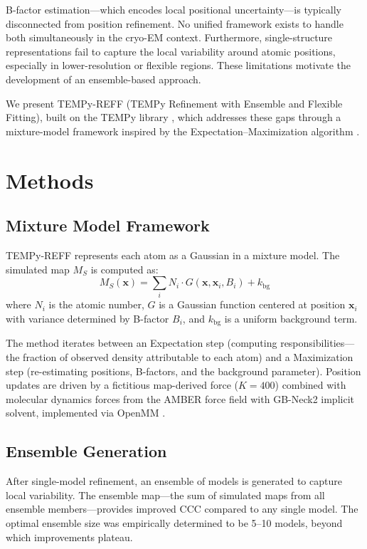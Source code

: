 \documentclass[11pt]{article}
\begin{document}
B-factor estimation---which encodes local positional uncertainty---is typically disconnected from position refinement. No unified framework exists to handle both simultaneously in the cryo-EM context. Furthermore, single-structure representations fail to capture the local variability around atomic positions, especially in lower-resolution or flexible regions. These limitations motivate the development of an ensemble-based approach.

We present TEMPy-REFF (TEMPy Refinement with Ensemble and Flexible Fitting), built on the TEMPy library \citep{farabella2015tempy}, which addresses these gaps through a mixture-model framework inspired by the Expectation--Maximization algorithm \citep{dempster1977em}.

\section{Methods}

\subsection{Mixture Model Framework}

TEMPy-REFF represents each atom as a Gaussian in a mixture model. The simulated map $M_S$ is computed as:
\begin{equation}
M_S(\mathbf{x}) = \sum_i N_i \cdot G(\mathbf{x}, \mathbf{x}_i, B_i) + k_{\text{bg}}
\end{equation}
where $N_i$ is the atomic number, $G$ is a Gaussian function centered at position $\mathbf{x}_i$ with variance determined by B-factor $B_i$, and $k_{\text{bg}}$ is a uniform background term.

The method iterates between an Expectation step (computing responsibilities---the fraction of observed density attributable to each atom) and a Maximization step (re-estimating positions, B-factors, and the background parameter). Position updates are driven by a fictitious map-derived force ($K = 400$) combined with molecular dynamics forces from the AMBER force field \citep{case2023amber} with GB-Neck2 implicit solvent, implemented via OpenMM \citep{eastman2017openmm}.

\subsection{Ensemble Generation}

After single-model refinement, an ensemble of models is generated to capture local variability. The ensemble map---the sum of simulated maps from all ensemble members---provides improved CCC compared to any single model. The optimal ensemble size was empirically determined to be 5--10 models, beyond which improvements plateau.
\end{document}
